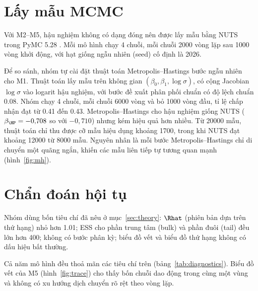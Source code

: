 \documentclass[12pt,a4paper]{report}
\begin{document}

\section{Lấy mẫu MCMC}
\label{sec:mcmc}

Với M2--M5, hậu nghiệm không có dạng đóng nên được lấy mẫu bằng NUTS trong PyMC
5.28 \cite{abrilpla2023pymc}. Mỗi mô hình chạy 4 chuỗi, mỗi chuỗi \num{2000}
vòng lặp sau \num{1000} vòng khởi động, với hạt giống ngẫu nhiên (seed) cố định
là 2026.

Để so sánh, nhóm tự cài đặt thuật toán Metropolis--Hastings bước ngẫu nhiên cho
M1. Thuật toán lấy mẫu trên không gian $(\beta_0, \beta_1, \log\sigma)$, có cộng
Jacobian $\log\sigma$ vào logarit hậu nghiệm, với bước đề xuất phân phối chuẩn
có độ lệch chuẩn \num{0.08}. Nhóm chạy 4 chuỗi, mỗi chuỗi \num{6000} vòng và bỏ
\num{1000} vòng đầu, tỉ lệ chấp nhận đạt từ \num{0.41} đến \num{0.43}.
Metropolis--Hastings cho hậu nghiệm giống NUTS ($\beta_{\HP} = -0{,}708$ so với
$-0{,}710$) nhưng kém hiệu quả hơn nhiều. Từ \num{20000} mẫu, thuật toán chỉ thu
được cỡ mẫu hiệu dụng khoảng \num{1700}, trong khi NUTS đạt khoảng \num{12000}
từ \num{8000} mẫu. Nguyên nhân là mỗi bước Metropolis--Hastings chỉ di chuyển một
quãng ngắn, khiến các mẫu liên tiếp tự tương quan mạnh (hình~\ref{fig:mh}).


\section{Chẩn đoán hội tụ}

Nhóm dùng bốn tiêu chí đã nêu ở mục~\ref{sec:theory}: $\Rhat$ (phiên bản dựa
trên thứ hạng) nhỏ hơn \num{1.01}; ESS cho phần trung tâm (bulk) và phần đuôi
(tail) đều lớn hơn 400; không có bước phân kỳ; biểu đồ vết và biểu đồ thứ hạng
không có dấu hiệu bất thường.

Cả năm mô hình đều thoả mãn các tiêu chí trên (bảng~\ref{tab:diagnostics}).
Biểu đồ vết của M5 (hình~\ref{fig:trace}) cho thấy bốn chuỗi dao động trong cùng
một vùng và không có xu hướng dịch chuyển rõ rệt theo vòng lặp.
\end{document}
